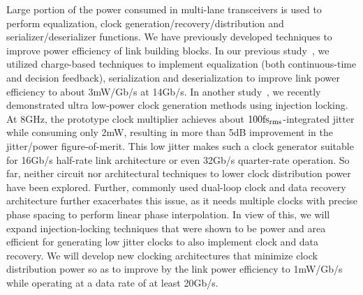 Large portion of the power consumed in multi-lane transceivers is used to perform equalization, clock generation/recovery/distribution and serializer/deserializer functions. 
We have previously developed techniques to improve power efficiency of link building blocks.
In our previous study~\cite{saxena20152}, we utilized charge-based techniques to implement equalization (both continuous-time and decision feedback), serialization and deserialization to improve link power efficiency to about 3mW/Gb/s at 14Gb/s. 
In another study~\cite{elkholy201610}, we recently demonstrated ultra low-power clock generation methods using injection locking. 
At 8GHz, the prototype clock multiplier achieves about $\rm 100 fs_{rms}$-integrated jitter while consuming only 2mW, resulting in more than 5dB improvement in the jitter/power figure-of-merit. 
This low jitter makes such a clock generator suitable for 16Gb/s half-rate link architecture or even 32Gb/s quarter-rate operation. 
So far, neither circuit nor architectural techniques to lower clock distribution power have been explored. 
Further, commonly used dual-loop clock and data recovery  architecture further exacerbates this issue, as it needs multiple clocks with precise phase spacing to perform linear phase interpolation. 
In view of this, we will expand injection-locking techniques that were shown to be power and area efficient for generating low jitter clocks to also implement clock and data recovery. 
We will develop new clocking architectures that minimize clock distribution power so as to improve by the link power efficiency to 1mW/Gb/s while operating at a data rate of at least 20Gb/s.

